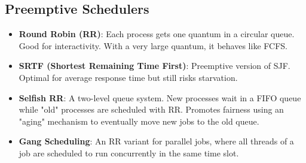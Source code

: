 \documentclass[8pt,a4paper]{article}
\begin{document}
\begin{multicols}{2}
\subsection*{Preemptive Schedulers}
\begin{itemize}
    \item \textbf{Round Robin (RR)}: Each process gets one quantum in a circular queue. Good for interactivity. With a very large quantum, it behaves like FCFS.
    \item \textbf{SRTF (Shortest Remaining Time First)}: Preemptive version of SJF. Optimal for average response time but still risks starvation.
    \item \textbf{Selfish RR}: A two-level queue system. New processes wait in a FIFO queue while "old" processes are scheduled with RR. Promotes fairness using an "aging" mechanism to eventually move new jobs to the old queue.
    \item \textbf{Gang Scheduling}: An RR variant for parallel jobs, where all threads of a job are scheduled to run concurrently in the same time slot.
\end{itemize}


\end{multicols}
\end{document}
